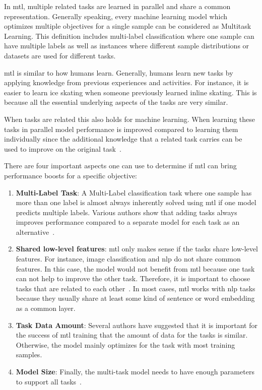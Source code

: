 In \gls{mtl}, multiple related tasks are learned in parallel and share a common representation. Generally speaking, every machine learning model which optimizes multiple objectives for a single sample can be considered as Multitask Learning. This definition includes multi-label classification where one sample can have multiple labels as well as instances where different sample distributions or datasets are used for different tasks.

\gls{mtl} is similar to how humans learn. Generally, humans learn new tasks by applying knowledge from previous experiences and activities. For instance, it is easier to learn ice skating when someone previously learned inline skating. This is because all the essential underlying aspects of the tasks are very similar.

When tasks are related this also holds for machine learning. When learning these tasks in parallel model performance is improved compared to learning them individually since the additional knowledge that a related task carries can be used to improve on the original task~\cite{Caruana1997a}. 

There are four important aspects one can use to determine if \gls{mtl} can bring performance boosts for a specific objective:
\begin{enumerate}
    \item \textbf{Multi-Label Task}: A Multi-Label classification task where one sample has more than one label is almost always inherently solved using \gls{mtl} if one model predicts multiple labels. Various authors show that adding tasks always improves performance compared to a separate model for each task as an alternative~\cite{Ramsundar2015}.
    \item \textbf{Shared low-level features}: \gls{mtl} only makes sense if the tasks share low-level features. For instance, image classification and \gls{nlp} do not share common features. In this case, the model would not benefit from \gls{mtl} because one task can not help to improve the other task. Therefore, it is important to choose tasks that are related to each other~\cite{Zhang2017a}. In most cases, \gls{mtl} works with \gls{nlp} tasks because they usually share at least some kind of sentence or word embedding as a common layer.
    \item \textbf{Task Data Amount}: Several authors have suggested that it is important for the success of \gls{mtl} training that the amount of data for the tasks is similar. Otherwise, the model mainly optimizes for the task with most training samples.
    \item \textbf{Model Size}: Finally, the multi-task model needs to have enough parameters to support all tasks~\cite{Caruana1997a}. 
    \end{enumerate}



